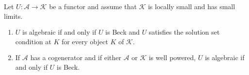 Let $U: \mathcal{A} \longrightarrow \mathcal{K}$ be a functor and assume that $\mathcal{K}$ is locally small and has small limits.
\begin{enumerate}
\item $U$ is algebraic if and only if $U$ is Beck and $U$ satisfies the solution set condition at $K$ for every object $K$ of $\mathcal{K}$.
\item If $\mathcal{A}$ has a cogenerator and if either $\mathcal{A}$ or $\mathcal{K}$ is well powered, $U$ is algebraic if and only if $U$ is Beck.
\end{enumerate}
